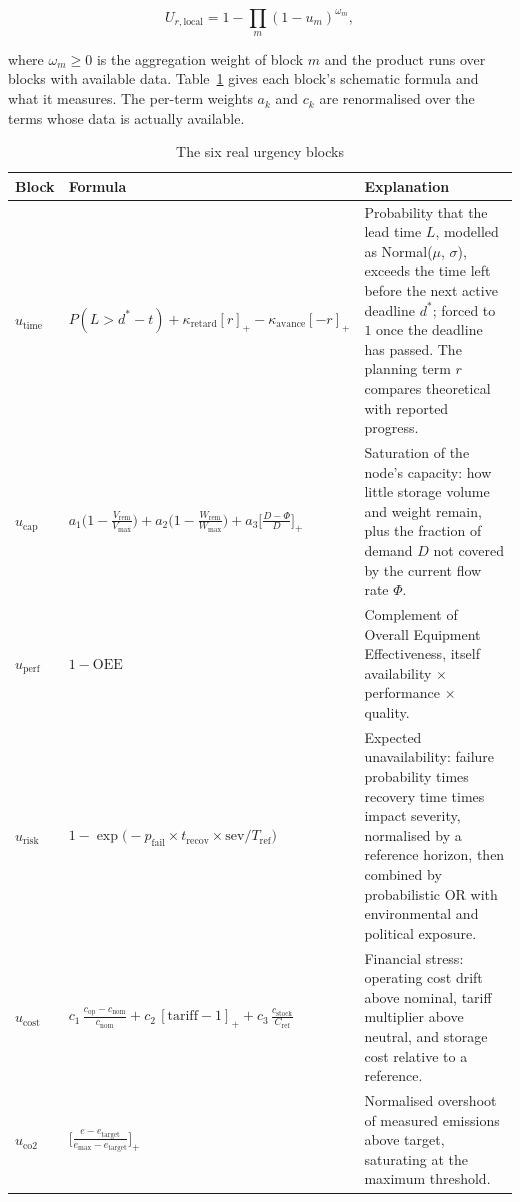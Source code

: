 \begin{equation}
    U_{r,\text{local}} = 1 - \prod_{m} (1 - u_m)^{\omega_m},
    \label{eq:ur_local}
\end{equation}

where $\omega_m \ge 0$ is the aggregation weight of block $m$ and the product runs over
blocks with available data. Table~\ref{tab:ur_blocks} gives each block's schematic formula
and what it measures. The per-term weights $a_k$ and $c_k$ are renormalised over the
terms whose data is actually available.

\begin{table}[htbp]
\centering
\caption{The six real urgency blocks}
\label{tab:ur_blocks}
\small
\begin{tabularx}{\linewidth}{l >{\raggedright\arraybackslash}p{4.6cm} X}
\toprule
\textbf{Block} & \textbf{Formula} & \textbf{Explanation} \\
\midrule
$u_{\text{time}}$ & $P(L > d^\ast - t) + \kappa_{\text{retard}}[r]_+ -
\kappa_{\text{avance}}[-r]_+$ & Probability that the lead time $L$, modelled as
Normal($\mu$, $\sigma$), exceeds the time left before the next active deadline $d^\ast$;
forced to $1$ once the deadline has passed. The planning term $r$ compares theoretical with
reported progress. \\
\midrule
$u_{\text{cap}}$ & $a_1\bigl(1-\tfrac{V_{\text{rem}}}{V_{\max}}\bigr) +
a_2\bigl(1-\tfrac{W_{\text{rem}}}{W_{\max}}\bigr) +
a_3\bigl[\tfrac{D-\Phi}{D}\bigr]_+$ & Saturation of the node's capacity: how little
storage volume and weight remain, plus the fraction of demand $D$ not covered by the
current flow rate $\Phi$. \\
\midrule
$u_{\text{perf}}$ & $1 - \text{OEE}$ & Complement of Overall Equipment Effectiveness,
itself availability $\times$ performance $\times$ quality. \\
\midrule
$u_{\text{risk}}$ & $1-\exp\bigl(-p_{\text{fail}} \times t_{\text{recov}} \times
\text{sev}/T_{\text{ref}}\bigr)$ & Expected unavailability: failure probability times
recovery time times impact severity, normalised by a reference horizon, then combined by
probabilistic OR with environmental and political exposure. \\
\midrule
$u_{\text{cost}}$ & $c_1\,\tfrac{c_{\text{op}}-c_{\text{nom}}}{c_{\text{nom}}} +
c_2\,[\text{tariff}-1]_+ + c_3\,\tfrac{c_{\text{stock}}}{C_{\text{ref}}}$ &
Financial stress: operating cost drift above nominal, tariff multiplier above neutral, and
storage cost relative to a reference. \\
\midrule
$u_{\text{co2}}$ & $\bigl[\tfrac{e - e_{\text{target}}}{e_{\max}-e_{\text{target}}}\bigr]_+$
& Normalised overshoot of measured emissions above target, saturating at the maximum
threshold. \\
\bottomrule
\end{tabularx}
\end{table}

